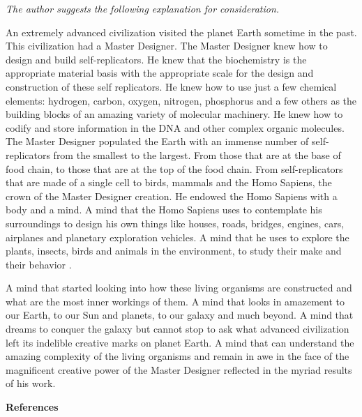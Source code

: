 \documentclass[letterpaper]{article}
\begin{document}
\bigskip

\textit{The author suggests the following explanation for
consideration.}


\bigskip

An extremely advanced civilization visited the planet Earth sometime in
the past. This civilization had a Master Designer.  The Master Designer
knew how to design and build self-replicators. He knew that the
biochemistry is the appropriate material basis with the appropriate
scale for the design and construction of these self replicators. He
knew how to use just a few chemical elements: hydrogen, carbon, oxygen,
nitrogen, phosphorus and a few others as the building blocks of an
amazing variety of molecular machinery. He knew how to codify and store
information in the DNA and other complex organic molecules. The Master
Designer populated the Earth with an immense number of self-replicators
from the smallest to the largest. From those that are at the base of
food chain, to those that are at the top of the food chain. From
self-replicators that are made of a single cell to birds, mammals and
the Homo Sapiens, the crown of the Master Designer creation.  He
endowed the Homo Sapiens with a body and a mind. A mind that the Homo
Sapiens uses to contemplate his surroundings to design his own things
like houses, roads, bridges, engines, cars, airplanes and planetary
exploration vehicles. A mind that he uses to explore the plants,
insects, birds and animals in the environment, to study their make and
their behavior .

A mind that started looking into how these living organisms are
constructed and what are the most inner workings of them. A mind that
looks in amazement to our Earth, to our Sun and planets, to our galaxy
and much beyond. A mind that dreams to conquer the galaxy but cannot
stop to ask what advanced civilization left its indelible creative
marks on planet Earth. A mind that can understand the amazing
complexity of the living organisms and remain in awe in the face of the
magnificent creative power of the Master Designer reflected in the
myriad results of his work.


\bigskip

{\bfseries
\hypertarget{RefHeading3168306210128}{}References}
\end{document}
